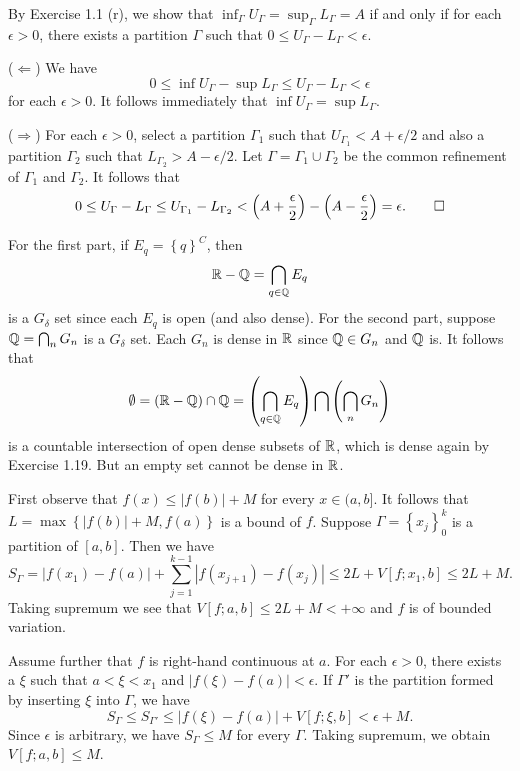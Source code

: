 
\begin{exercise}{1.15}
  By Exercise 1.1 (r),
  we show that $\inf_{\Gamma} U_\Gamma = \sup_{\Gamma} L_\Gamma = A$
  if and only if for each $\epsilon > 0$,
  there exists a partition $\Gamma$ such that $0 \le U_\Gamma - L_\Gamma < \epsilon$.

  ($\Longleftarrow$) We have
  \[
    0 \le \inf U_\Gamma - \sup L_\Gamma \le U_\Gamma - L_\Gamma < \epsilon
  \]
  for each $\epsilon > 0$.
  It follows immediately that $\inf U_\Gamma = \sup L_\Gamma$.

  ($\Longrightarrow$) For each $\epsilon > 0$,
  select a partition $\Gamma_1$ such that $U_{\Gamma_1} < A + \epsilon/2$
  and also a partition $\Gamma_2$ such that $L_{\Gamma_2} > A - \epsilon/2$.
  Let $\Gamma = \Gamma_1 \cup \Gamma_2$ be the common refinement of $\Gamma_1$ and $\Gamma_2$.
  It follows that
  \[
    0 \le U_{\Gamma} - L_{\Gamma} \le U_{\Gamma_1} - L_{\Gamma_2}
    < \left( A + \frac{\epsilon}{2} \right) - \left( A - \frac{\epsilon}{2} \right) = \epsilon.
    \qedhere
  \]
\end{exercise}

\begin{exercise}{1.20}
  For the first part, if $E_q = \left\{ q \right\}^C$, then
  \[
    \mathbb{R} - \mathbb{Q} = \bigcap_{q \in \mathbb{Q}} E_q
  \]
  is a $G_\delta$ set since each $E_q$ is open (and also dense).
  For the second part,
  suppose $\mathbb{Q} = \bigcap_n G_n$ is a $G_\delta$ set.
  Each $G_n$ is dense in $\mathbb{R}$ since $\mathbb{Q} \in G_n$ and $\mathbb{Q}$ is.
  It follows that
  \[
    \emptyset = \left( \mathbb{R} - \mathbb{Q} \right) \cap \mathbb{Q}
    = \left( \bigcap_{q \in \mathbb{Q}} E_q \right) \bigcap \left( \bigcap_n G_n \right)
  \]
  is a countable intersection of open dense subsets of $\mathbb{R}$,
  which is dense again by Exercise 1.19.
  But an empty set cannot be dense in $\mathbb{R}$.
\end{exercise}

\begin{exercise}{2.5}
  First observe that $f(x) \le |f(b)| + M$ for every $x \in (a, b]$.
  It follows that $L = \max \left\{ |f(b)| + M, f(a) \right\}$ is a bound of $f$.
  Suppose $\Gamma = \left\{ x_j \right\}_0^k$ is a partition of $[a, b]$.
  Then we have
  \[
    S_{\Gamma} = \left| f(x_1) - f(a) \right| +
    \sum_{j = 1}^{k-1} \left| f(x_{j+1}) - f(x_j) \right|
    \le 2L + V[f; x_1,b]
    \le 2L + M.
  \]
  Taking supremum we see that $V[f;a,b] \le 2L + M < +\infty$
  and $f$ is of bounded variation.

  Assume further that $f$ is right-hand continuous at $a$.
  For each $\epsilon > 0$, there exists a $\xi$ such that
  $a < \xi < x_1$ and $|f(\xi) - f(a)| < \epsilon$.
  If $\Gamma'$ is the partition formed by inserting $\xi$ into $\Gamma$,
  we have
  \[
    S_\Gamma \le S_{\Gamma'} \le \left| f(\xi) - f(a) \right| + V[f; \xi, b]
    < \epsilon + M.
  \]
  Since $\epsilon$ is arbitrary, we have $S_{\Gamma} \le M$ for every $\Gamma$.
  Taking supremum, we obtain $V[f;a,b] \le M$.
\end{exercise}

